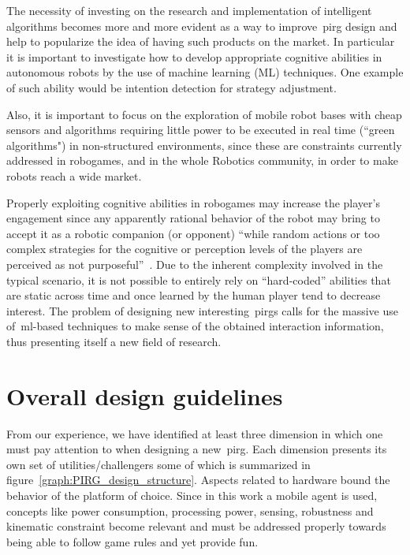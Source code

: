 The necessity of investing on the research and implementation of intelligent algorithms becomes more and more evident as a way to improve~\gls{pirg} design and help to popularize the idea of having such products on the market. In particular it is important to investigate how to develop appropriate cognitive abilities in autonomous robots by the use of machine learning (ML) techniques. One example of such ability would be  intention detection for strategy adjustment. 

Also, it is important to focus on the exploration of mobile robot bases with cheap sensors and algorithms requiring little power to be executed in real time (``green algorithms") in non-structured environments, since these are constraints currently addressed in robogames, and in the whole Robotics community, in order to make robots reach a wide market. 

Properly exploiting cognitive abilities in robogames may increase the player's engagement since any apparently rational behavior of the robot may bring to accept it as a robotic companion (or opponent) ``while random actions or too complex strategies for the cognitive or perception levels of the players are perceived as not purposeful''~\citep{martinoia_physically_2013}. Due to the inherent complexity involved in the typical scenario, it is not possible to entirely rely on ``hard-coded'' abilities that are static across time and once learned by the human player tend to decrease interest. The problem of designing new interesting~\gls{pirg}s calls for the massive use of~\gls{ml}-based techniques to make sense of the obtained interaction information, thus presenting itself a new field of research.

\section{Overall design guidelines}
From our experience, we have identified at least three dimension in which one must pay attention to when designing a new~\gls{pirg}. Each dimension presents its own set of utilities/challengers some of which is summarized in figure~\ref{graph:PIRG_design_structure}. Aspects related to hardware bound the behavior of the platform of choice. Since in this work a mobile agent is used, concepts like power consumption, processing power, sensing, robustness and kinematic constraint become relevant and must be addressed properly towards being able to follow game rules and yet provide fun. 

